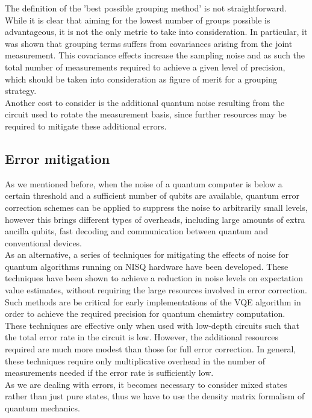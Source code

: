 The definition of the ’best possible grouping method’ is not straightforward. While it is clear that aiming for the lowest number of groups possible is advantageous, it is not the only metric to take into consideration. In particular, it was shown that grouping terms suffers from covariances arising from the joint measurement. This covariance effects increase the
sampling noise and as such the total number of measurements required to achieve a given level of precision, which should be taken into consideration as figure of merit for a grouping strategy. \\
Another cost to consider is the additional quantum noise resulting from the circuit used to rotate the measurement basis, since further resources may be required to mitigate these additional errors.

\subsection{Error mitigation}
As we mentioned before, when the noise of a quantum computer is below a certain threshold and a sufficient number of qubits are available, quantum error correction schemes can be applied to suppress the noise to arbitrarily small levels, however this brings different types of overheads, including large amounts of extra ancilla qubits, fast decoding and communication between quantum and conventional devices. \\
As an alternative, a series of techniques for mitigating the effects of noise for quantum algorithms running on NISQ hardware have been developed. These techniques have been shown to achieve a reduction in noise levels on expectation value estimates, without requiring the large resources involved in error correction. Such methods are be critical for early implementations of the VQE algorithm in order to achieve the required precision for quantum chemistry computation. \\
These techniques are effective only when used with low-depth circuits such that the total error rate in the circuit is low. However, the additional resources required are much more modest than those for full error correction. In general, these techniques require only multiplicative overhead in the number of measurements needed if the error rate is sufficiently low. \\
As we are dealing with errors, it becomes necessary to consider mixed states rather than just pure states, thus we have to use the density matrix formalism of quantum mechanics. \\

